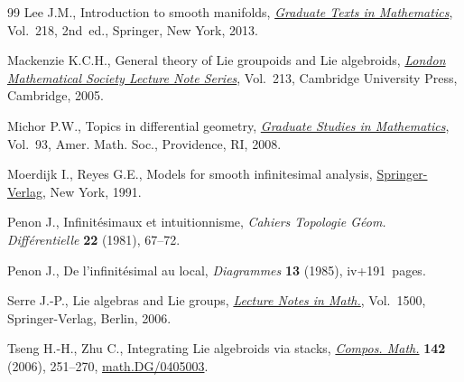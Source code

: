 \documentclass[10pt,a4paper]{amsart}
\numberwithin{equation}{section}
\begin{document}
\begin{thebibliography}{99}
Lee J.M., Introduction to smooth manifolds, \href{https://doi.org/10.1007/978-1-4419-9982-5}{\textit{Graduate Texts in
 Mathematics}}, Vol.~218, 2nd~ed., Springer, New York, 2013.

Mackenzie K.C.H., General theory of {L}ie groupoids and {L}ie algebroids,
 \href{https://doi.org/10.1017/CBO9781107325883}{\textit{London Mathematical Society Lecture Note Series}}, Vol.~213, Cambridge
 University Press, Cambridge, 2005.

Michor P.W., Topics in dif\/ferential geometry, \href{https://doi.org/10.1090/gsm/093}{\textit{Graduate Studies in
 Mathematics}}, Vol.~93, Amer. Math. Soc., Providence, RI, 2008.

Moerdijk I., Reyes G.E., Models for smooth inf\/initesimal analysis,
 \href{https://doi.org/10.1007/978-1-4757-4143-8}{Springer-Verlag}, New York, 1991.

Penon J., Inf\/init\'esimaux et intuitionnisme, \textit{Cahiers Topologie G\'eom.
 Diff\'erentielle} \textbf{22} (1981), 67--72.

Penon J., De l'inf\/init\'esimal au local, \textit{Diagrammes} \textbf{13}
 (1985), iv+191~pages.

Serre J.-P., Lie algebras and {L}ie groups, \href{https://doi.org/10.1007/978-3-540-70634-2}{\textit{Lecture Notes in Math.}},
 Vol.~1500, Springer-Verlag, Berlin, 2006.

Tseng H.-H., Zhu C., Integrating {L}ie algebroids via stacks, \href{https://doi.org/10.1112/S0010437X05001752}{\textit{Compos.
 Math.}} \textbf{142} (2006), 251--270, \href{http://arxiv.org/abs/math.DG/0405003}{math.DG/0405003}.

\end{thebibliography}
\end{document}
